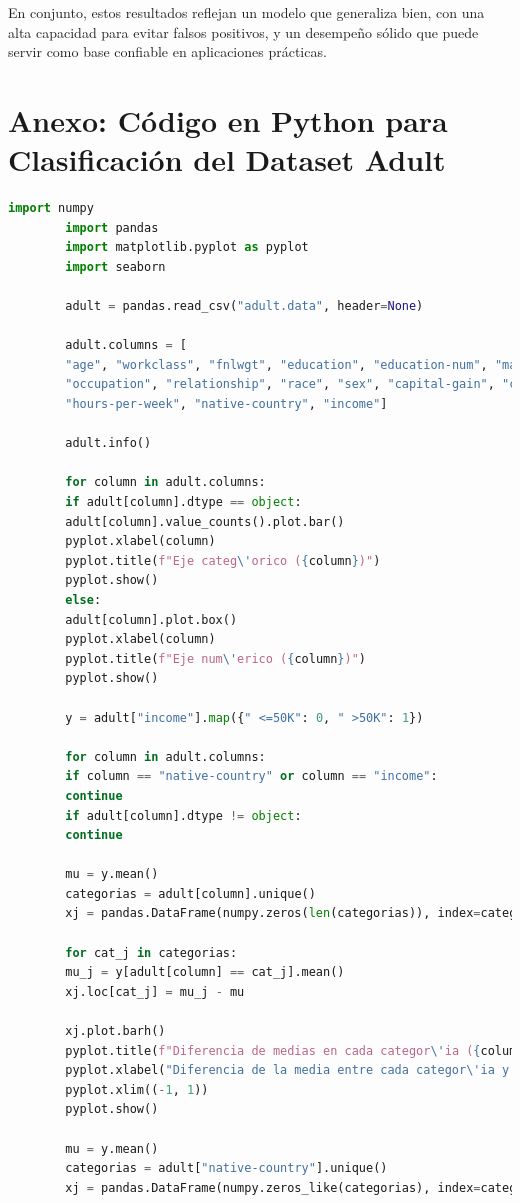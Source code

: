\documentclass{article}
\begin{document}
	
	En conjunto, estos resultados reflejan un modelo que generaliza bien, con una alta capacidad para evitar falsos positivos, y un desempeño sólido que puede servir como base confiable en aplicaciones prácticas.
	
	\newpage
	
	\section{Anexo: C\'odigo en Python para Clasificaci\'on del Dataset Adult}
	
	\begin{lstlisting}[language=Python]
		import numpy
		import pandas
		import matplotlib.pyplot as pyplot
		import seaborn
		
		adult = pandas.read_csv("adult.data", header=None)
		
		adult.columns = [
		"age", "workclass", "fnlwgt", "education", "education-num", "marital-status",
		"occupation", "relationship", "race", "sex", "capital-gain", "capital-loss",
		"hours-per-week", "native-country", "income"]
		
		adult.info()
		
		for column in adult.columns:
		if adult[column].dtype == object:
		adult[column].value_counts().plot.bar()
		pyplot.xlabel(column)
		pyplot.title(f"Eje categ\'orico ({column})")
		pyplot.show()
		else:
		adult[column].plot.box()
		pyplot.xlabel(column)
		pyplot.title(f"Eje num\'erico ({column})")
		pyplot.show()
		
		y = adult["income"].map({" <=50K": 0, " >50K": 1})
		
		for column in adult.columns:
		if column == "native-country" or column == "income":
		continue
		if adult[column].dtype != object:
		continue
		
		mu = y.mean()
		categorias = adult[column].unique()
		xj = pandas.DataFrame(numpy.zeros(len(categorias)), index=categorias, columns=[column])
		
		for cat_j in categorias:
		mu_j = y[adult[column] == cat_j].mean()
		xj.loc[cat_j] = mu_j - mu
		
		xj.plot.barh()
		pyplot.title(f"Diferencia de medias en cada categor\'ia ({column})")
		pyplot.xlabel("Diferencia de la media entre cada categor\'ia y la media global")
		pyplot.xlim((-1, 1))
		pyplot.show()
		
		mu = y.mean()
		categorias = adult["native-country"].unique()
		xj = pandas.DataFrame(numpy.zeros_like(categorias), index=categorias, columns=["native-country"])
		

\end{lstlisting}
\end{document}
